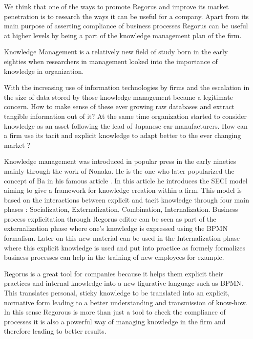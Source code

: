 \documentclass[10pt]{report}
\begin{document}
We think that one of the ways to promote Regorus and improve its market penetration is to research the ways it can be useful for a company. Apart from its main purpose of asserting compliance of business processes Regorus can be useful at higher levels by being a part of the knowledge management plan of the firm.

Knowledge Management is a relatively new field of study born in the early eighties when researchers in management looked into the importance of knowledge in organization.\autocite{Wiig19971}

With the increasing use of information technologies by firms and the escalation in the size of data stored by those knowledge management became a legitimate concern. How to make sense of these ever growing raw databases and extract tangible information out of it? At the same time organization started to consider knowledge as an asset following the lead of Japanese car manufacturers.\autocite{Koenig08} How can a firm use its tacit and explicit knowledge to adapt better to the ever changing market ?

Knowledge management was introduced in popular press in the early nineties mainly through the work of Nonaka. \autocite{nonaka1991knowledge} He is the one who later popularized the concept of Ba in his famous article \autocite{Nonaka_Konno_1998}. In this article he introduces the SECI model aiming to give a framework for knowledge creation within a firm. This model is based on the interactions between explicit and tacit knowledge through four main phases : Socialization, Externalization, Combination, Internalization. Business process explicitation through Regorus editor can be seen as part of the externalization phase where one's knowledge is expressed using the BPMN formalism. Later on this new material can be used in the Internalization phase where this explicit knowledge is used and put into practice as formely formalizes business processes can help in the training of new employees for example.

Regorus is a great tool for companies because it helps them explicit their practices and internal knowledge into a new figurative language such as BPMN. This translates personal, sticky knowledge to be translated into an explicit, normative form leading to a better understanding and transmission of know-how. In this sense Regorous is more than just a tool to check the compliance of processes it is also a powerful way of managing knowledge in the firm and therefore leading to better results.
\end{document}
